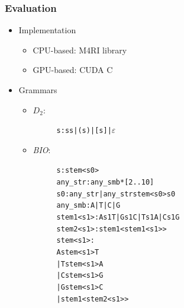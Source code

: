 \documentclass[xcolor=table]{beamer}
\begin{document}
\begin{frame}[fragile] \frametitle{Evaluation}
    \begin{itemize}
        \item Implementation
        \begin{itemize}
            \item CPU-based: M4RI library
            \item GPU-based: CUDA C
        \end{itemize}
        \item Grammars
        \begin{itemize}
            \item $D_2$:
            \vspace{-12pt}
            \begin{figure}[t]
            \begin{minipage}{0.4\textwidth}
            \footnotesize
            \begin{alltt}
s: s s | ( s ) | [ s ] | \(\varepsilon \)
            \end{alltt}
            \end{minipage}
            \end{figure}

            \item \textit{BIO}:
            \vspace{-12pt}
            \begin{figure}[t]
            \begin{minipage}{0.4\textwidth}
            \footnotesize
            \begin{alltt}
s: stem<s0>
any_str: any_smb*[2..10]
s0: any_str | any_str stem<s0> s0
any_smb: A | T | C | G
stem1<s1>: A s1 T | G s1 C | T s1 A | C s1 G 
stem2<s1>: stem1<stem1<s1>>
stem<s1>:  
      A stem<s1> T 
    | T stem<s1> A 
    | C stem<s1> G 
    | G stem<s1> C 
    | stem1<stem2<s1>>              
            \end{alltt}
            \end{minipage}
            \end{figure}

        \end{itemize}
        
    \end{itemize}

\end{frame}
\end{document}
